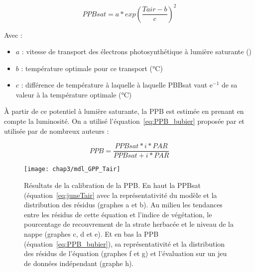 \begin{equation}\label{eq:juneTair}
PPBsat = a * exp\left(\frac{Tair - b}{c}\right)^2
\end{equation}

Avec :
\begin{itemize}
\item $a$ : vitesse de transport des électrons photosynthétique à lumière saturante (\si{\uml})
\item $b$ : température optimale pour ce transport (\si{\degreeCelsius})
\item $c$ : différence de température à laquelle à laquelle PBBsat vaut e$^{-1}$ de sa valeur à la température optimale (\si{\degreeCelsius})
\end{itemize}

À partir de ce potentiel à lumière saturante, la PPB est estimée en prenant en compte la luminosité.
On a utilisé l'équation~\ref{eq:PPB_bubier} proposée par \citep{bubier1998} et utilisée par de nombreux auteurs \citep{bortoluzzi2006a,worrall2009}:

\begin{equation} \label{eq:PPB_bubier}
PPB = \frac{PPBsat * i * PAR}{PPBsat + i * PAR}
\end{equation}

\begin{figure} %
\centering
\texttt{[image: chap3/mdl\_GPP\_Tair]}
\caption{Résultats de la calibration de la PPB. En haut la PPBsat (équation~\ref{eq:juneTair} avec la représentativité du modèle et la distribution des résidus (graphes a et b). Au milieu les tendances entre les résidus de cette équation et l'indice de végétation, le pourcentage de recouvrement de la strate herbacée et le niveau de la nappe (graphes c, d et e). Et en bas la PPB (équation~\ref{eq:PPB_bubier}), sa représentativité et la distribution des résidus de l'équation (graphes f et g) et l'évaluation sur un jeu de données indépendant (graphe h).}
\label{fig:mdl_GPP_Tair}
\end{figure}

